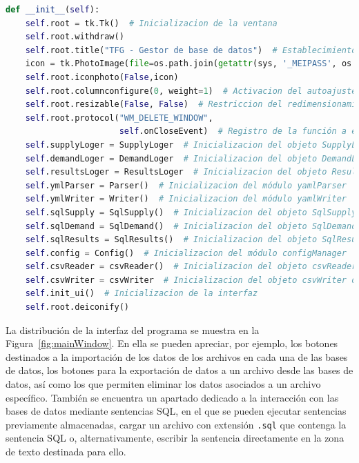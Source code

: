 \begin{lstlisting}[language=Python,
                   style=python,
                   frame=none,
                   numbers=none,
                   basicstyle=\ttfamily\normalsize,
                   caption={Constructor de la clase \texttt{UI}},
                   label=src:uiClassConstructor,
                   inputencoding=utf8]                   
def __init__(self):
    self.root = tk.Tk()  # Inicializacion de la ventana
    self.root.withdraw()
    self.root.title("TFG - Gestor de base de datos")  # Establecimiento del nombre de la ventana
    icon = tk.PhotoImage(file=os.path.join(getattr(sys, '_MEIPASS', os.path.dirname(os.path.abspath(__file__))),"icon.png"))
    self.root.iconphoto(False,icon)
    self.root.columnconfigure(0, weight=1)  # Activacion del autoajuste de la columna 0
    self.root.resizable(False, False)  # Restriccion del redimensionamiento de la ventana principal
    self.root.protocol("WM_DELETE_WINDOW",
                       self.onCloseEvent)  # Registro de la función a ejecutar al cerrar la aplicacion
    self.supplyLoger = SupplyLoger  # Inicializacion del objeto SupplyLoger
    self.demandLoger = DemandLoger  # Inicializacion del objeto DemandLoger
    self.resultsLoger = ResultsLoger  # Inicializacion del objeto ResultsLoger
    self.ymlParser = Parser()  # Inicializacion del módulo yamlParser
    self.ymlWriter = Writer()  # Inicializacion del módulo yamlWriter
    self.sqlSupply = SqlSupply()  # Inicializacion del objeto SqlSupply del módulo SQLHandler
    self.sqlDemand = SqlDemand()  # Inicializacion del objeto SqlDemand del módulo SQLHandler
    self.sqlResults = SqlResults()  # Inicializacion del objeto SqlResults del módulo SQLHandler
    self.config = Config()  # Inicializacion del módulo configManager
    self.csvReader = csvReader()  # Inicializacion del objeto csvReader del módulo csvHandler
    self.csvWriter = csvWriter  # Inicializacion del objeto csvWriter del módulo csvHandler
    self.init_ui()  # Inicializacion de la interfaz
    self.root.deiconify()
\end{lstlisting}

La distribución de la interfaz del programa se muestra en la Figura~\ref{fig:mainWindow}. En ella se pueden apreciar, por ejemplo, los botones destinados a la importación de los datos de los archivos en cada una de las bases de datos, los botones para la exportación de datos a un archivo desde las bases de datos, así como los que permiten eliminar los datos asociados a un archivo específico. También se encuentra un apartado dedicado a la interacción con las bases de datos mediante sentencias \acrshort{SQL}, en el que se pueden ejecutar sentencias previamente almacenadas, cargar un archivo con extensión \texttt{.sql} que contenga la sentencia \acrshort{SQL} o, alternativamente, escribir la sentencia directamente en la zona de texto destinada para ello. 

